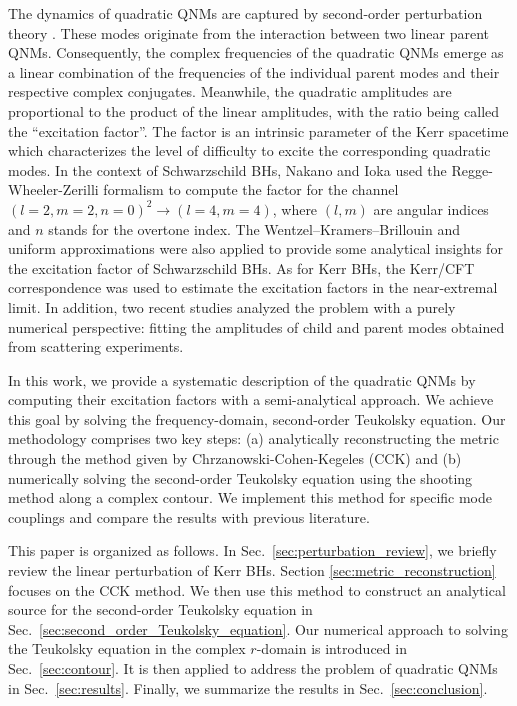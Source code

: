 \documentclass[aps,prd,amsmath,floats,floatfix, twocolumn,
superscriptaddress,nofootinbib,showpacs]{revtex4-1}
\begin{document}
The dynamics of quadratic QNMs are captured by second-order perturbation theory \cite{Gleiser:1995gx,Campanelli:1998jv,Nakano:2007cj,Ioka:2007ak,Loutrel:2020wbw,Ripley:2020xby,Lagos:2022otp,Spiers:2023cip}. These modes originate from the interaction between two linear parent QNMs. Consequently, the complex frequencies of the quadratic QNMs emerge as a linear combination of the frequencies of the individual parent modes and their respective complex conjugates. Meanwhile, the quadratic amplitudes are proportional to the product of the linear amplitudes, with the ratio being called the ``excitation factor''. The factor is an intrinsic parameter of the Kerr spacetime which characterizes the level of difficulty to excite the corresponding quadratic modes. In the context of Schwarzschild BHs, Nakano and Ioka \cite{Nakano:2007cj,Ioka:2007ak} used the Regge-Wheeler-Zerilli formalism to compute the factor for the channel $(l=2,m=2,n=0)^2 \to (l=4,m=4)$, where $(l,m)$ are angular indices and $n$ stands for the overtone index. The Wentzel–Kramers–Brillouin \cite{Perrone:2023jzq} and uniform \cite{Bucciotti:2023ets} approximations were also applied to provide some analytical insights for the excitation factor of Schwarzschild BHs. As for Kerr BHs, the Kerr/CFT correspondence \cite{Kehagias:2023ctr} was used to estimate the excitation factors in the near-extremal limit. In addition, two recent studies \cite{Redondo-Yuste:2023seq,Zhu:2024rej} analyzed the problem with a purely numerical perspective: fitting the amplitudes of child and parent modes obtained from scattering experiments. 

In this work, we provide a systematic description of the quadratic QNMs by computing their excitation factors with a semi-analytical approach. We achieve this goal by solving the frequency-domain, second-order Teukolsky equation. Our methodology comprises two key steps: (a) analytically reconstructing the metric through the method given by Chrzanowski-Cohen-Kegeles (CCK) \cite{1975PhRvD..11.2042C,COHEN19755,1979PhRvD..19.1641K} and (b) numerically solving the second-order Teukolsky equation using the shooting method along a complex contour. We implement this method for specific mode couplings and compare the results with previous literature.

This paper is organized as follows. In Sec.~\ref{sec:perturbation_review}, we briefly review the linear perturbation of Kerr BHs. Section \ref{sec:metric_reconstruction} focuses on the CCK method. We then use this method to construct an analytical source for the second-order Teukolsky equation in Sec.~\ref{sec:second_order_Teukolsky_equation}. Our numerical approach to solving the Teukolsky equation in the complex $r$-domain is introduced in Sec.~\ref{sec:contour}. It is then applied to address the problem of quadratic QNMs in Sec.~\ref{sec:results}. Finally, we summarize the results in Sec.~\ref{sec:conclusion}.
\end{document}
